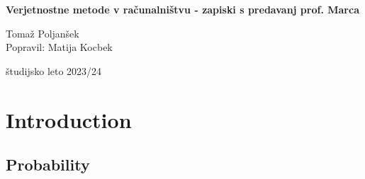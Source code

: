 \documentclass[a4paper, 12pt]{book}
\title{\ttitle}
\author{\tauthor}
\date{\tdate}
\newcommand{\ttitle}{Verjetnostne metode v računalništvu - zapiski s predavanj prof. Marca}
\newcommand{\tauthor}{Tomaž Poljanšek\\Popravil: Matija Kocbek}
\newcommand{\tdate}{študijsko leto 2023/24}
\theoremstyle{definition}
\theoremstyle{remark}
\newcommand\mymaketitle{
  \begin{titlepage}
    \begin{center}
        \vspace*{4cm}
        \Huge
        \textbf{\ttitle}
                        
        \vspace{1.5cm}
        \huge
        \tauthor
            
        \vspace{3cm}
        \Large
        \tdate
    \end{center}
  \end{titlepage}
}
\begin{document}
\renewcommand{\thepage}{}
\newcommand{\sn}[1]{"`#1"'}

\mymaketitle

\clearpage

\frontmatter

\pagestyle{empty}
\def\thepage{}
\tableofcontents{}

\def\x{\hspace{3ex}}    %
\def\y{\hspace{2.45ex}}  %
\def\z{\hspace{1.9ex}}    %
\stackMath





\mainmatter
\setcounter{page}{1}
\pagestyle{fancy}




\chapter{Introduction}


\section{Probability}
\end{document}
